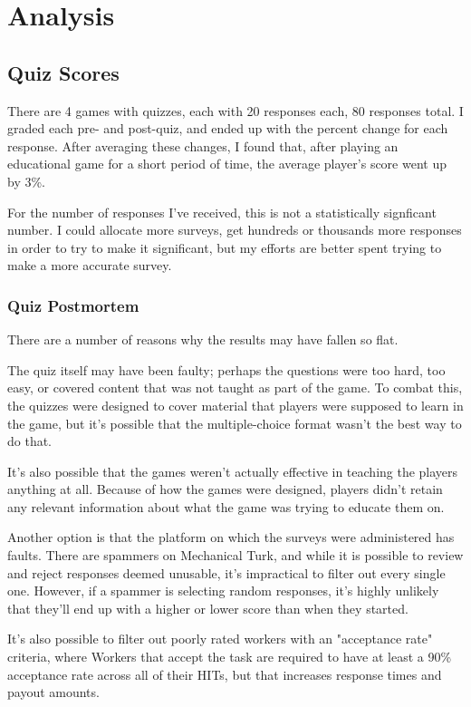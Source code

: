\section{Analysis}
	\subsection{Quiz Scores}
		There are 4 games with quizzes, each with 20 responses each, 80 responses total. I graded each pre- and post-quiz, and ended up with the percent change for each response. After averaging these changes, I found that, after playing an educational game for a short period of time, the average player's score went up by 3\%.

		For the number of responses I've received, this is not a statistically signficant number. I could allocate more surveys, get hundreds or thousands more responses in order to try to make it significant, but my efforts are better spent trying to make a more accurate survey.

		\subsubsection{Quiz Postmortem}
			There are a number of reasons why the results may have fallen so flat.

			The quiz itself may have been faulty; perhaps the questions were too hard, too easy, or covered content that was not taught as part of the game. To combat this, the quizzes were designed to cover material that players were supposed to learn in the game, but it's possible that the multiple-choice format wasn't the best way to do that.

			It's also possible that the games weren't actually effective in teaching the players anything at all. Because of how the games were designed, players didn't retain any relevant information about what the game was trying to educate them on.

			Another option is that the platform on which the surveys were administered has faults. There are spammers on Mechanical Turk, and while it is possible to review and reject responses deemed unusable, it's impractical to filter out every single one. However, if a spammer is selecting random responses, it's highly unlikely that they'll end up with a higher or lower score than when they started. 

			It's also possible to filter out poorly rated workers with an "acceptance rate" criteria, where Workers that accept the task are required to have at least a 90\% acceptance rate across all of their HITs, but that increases response times and payout amounts.

